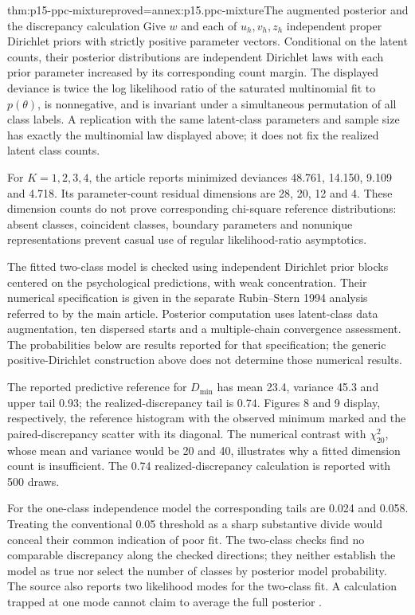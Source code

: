 \begin{hbtheorem}{thm:p15-ppc-mixture}{proved=annex:p15.ppc-mixture}{The augmented posterior and the discrepancy calculation}
Give \(w\) and each of \(u_h,v_h,z_h\) independent proper Dirichlet
priors with strictly positive parameter vectors. Conditional on the latent
counts, their posterior distributions are independent Dirichlet laws with
each prior parameter increased by its corresponding count margin.
The displayed deviance is twice the log likelihood ratio of the saturated
multinomial fit to \(p(\theta)\), is nonnegative, and is invariant under
a simultaneous permutation of all class labels. A replication with the
same latent-class parameters and sample size has exactly the multinomial
law displayed above; it does not fix the realized latent class counts.
\end{hbtheorem}

For \(K=1,2,3,4\), the article reports minimized deviances
48.761, 14.150, 9.109 and 4.718. Its parameter-count residual dimensions
are 28, 20, 12 and 4. These dimension counts do not prove corresponding
chi-square reference distributions: absent classes, coincident classes,
boundary parameters and nonunique representations prevent casual use of
regular likelihood-ratio asymptotics.

The fitted two-class model is checked using independent Dirichlet prior
blocks centered on the psychological predictions, with weak concentration.
Their numerical specification is given in the separate Rubin--Stern
1994 analysis referred to by the main article.
Posterior computation uses latent-class data augmentation, ten dispersed
starts and a multiple-chain convergence assessment. The probabilities below
are results reported for that specification; the generic positive-Dirichlet
construction above does not determine those numerical results.

The reported predictive reference for \(D_{\min}\) has mean 23.4,
variance 45.3 and upper tail 0.93; the realized-discrepancy tail is 0.74.
Figures 8 and 9 display, respectively, the reference histogram with the
observed minimum marked and the paired-discrepancy scatter with its diagonal.
The numerical contrast with \(\chi^2_{20}\), whose mean and variance
would be 20 and 40, illustrates why a fitted dimension count is insufficient.
The 0.74 realized-discrepancy calculation is reported with 500 draws.

For the one-class independence model the corresponding tails are 0.024
and 0.058. Treating the conventional 0.05 threshold as a sharp substantive
divide would conceal their common indication of poor fit. The two-class
checks find no comparable discrepancy along the checked directions; they
neither establish the model as true nor select the number of classes by
posterior model probability. The source also reports two likelihood modes
for the two-class fit. A calculation trapped at one mode cannot claim to
average the full posterior \cite[secs.~3.3--3.4]{GelmanMengStern1996Main}.

